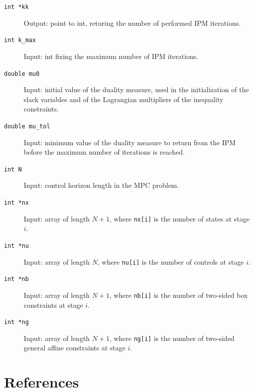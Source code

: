 \documentclass[a4paper]{report}
\begin{document}
\begin{description}

\item[\tt int *kk] Output: point to int, returing the number of performed IPM iterations.

\item[\tt int k\_max] Input: int fixing the maximum number of IPM iterations.

\item[\tt double mu0] Input: initial value of the duality measure, used in the initialization of the slack variables and of the Lagrangian multipliers of the inequality constraints.

\item[\tt double mu\_tol] Input: minimum value of the duality measure to return from the IPM before the maximum number of iterations is reached.

\item[\tt int N] Input: control horizon length in the MPC problem.

\item[\tt int *nx] Input: array of length $N+1$, where {\tt nx[i]} is the number of states at stage $i$.

\item[\tt int *nu] Input: array of length $N$, where {\tt nu[i]} is the number of controls at stage $i$.

\item[\tt int *nb] Input: array of length $N+1$, where {\tt nb[i]} is the number of two-sided box constraints at stage $i$.

\item[\tt int *ng] Input: array of length $N+1$, where {\tt ng[i]} is the number of two-sided general affine constraints at stage $i$.

\end{description}




\chapter{References}
\end{document}
